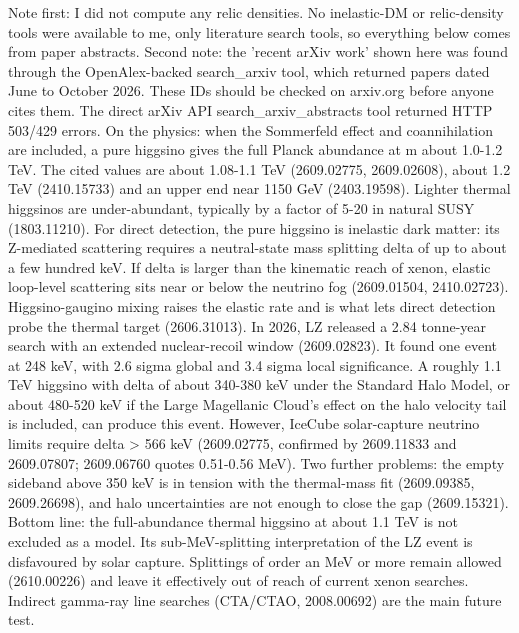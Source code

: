 \documentclass[11pt,a4paper]{article}
\begin{document}
Note first: I did not compute any relic densities. No inelastic-DM or relic-density tools were available to me, only literature search tools, so everything below comes from paper abstracts. Second note: the 'recent arXiv work' shown here was found through the OpenAlex-backed search\_arxiv tool, which returned papers dated June to October 2026. These IDs should be checked on arxiv.org before anyone cites them. The direct arXiv API search\_arxiv\_abstracts tool returned HTTP 503/429 errors. On the physics: when the Sommerfeld effect and coannihilation are included, a pure higgsino gives the full Planck abundance at m about 1.0-1.2 TeV. The cited values are about 1.08-1.1 TeV (2609.02775, 2609.02608), about 1.2 TeV (2410.15733) and an upper end near 1150 GeV (2403.19598). Lighter thermal higgsinos are under-abundant, typically by a factor of 5-20 in natural SUSY (1803.11210). For direct detection, the pure higgsino is inelastic dark matter: its Z-mediated scattering requires a neutral-state mass splitting delta of up to about a few hundred keV. If delta is larger than the kinematic reach of xenon, elastic loop-level scattering sits near or below the neutrino fog (2609.01504, 2410.02723). Higgsino-gaugino mixing raises the elastic rate and is what lets direct detection probe the thermal target (2606.31013). In 2026, LZ released a 2.84 tonne-year search with an extended nuclear-recoil window (2609.02823). It found one event at 248 keV, with 2.6 sigma global and 3.4 sigma local significance. A roughly 1.1 TeV higgsino with delta of about 340-380 keV under the Standard Halo Model, or about 480-520 keV if the Large Magellanic Cloud's effect on the halo velocity tail is included, can produce this event. However, IceCube solar-capture neutrino limits require delta \textgreater{} 566 keV (2609.02775, confirmed by 2609.11833 and 2609.07807; 2609.06760 quotes 0.51-0.56 MeV). Two further problems: the empty sideband above 350 keV is in tension with the thermal-mass fit (2609.09385, 2609.26698), and halo uncertainties are not enough to close the gap (2609.15321). Bottom line: the full-abundance thermal higgsino at about 1.1 TeV is not excluded as a model. Its sub-MeV-splitting interpretation of the LZ event is disfavoured by solar capture. Splittings of order an MeV or more remain allowed (2610.00226) and leave it effectively out of reach of current xenon searches. Indirect gamma-ray line searches (CTA/CTAO, 2008.00692) are the main future test.
\end{document}
